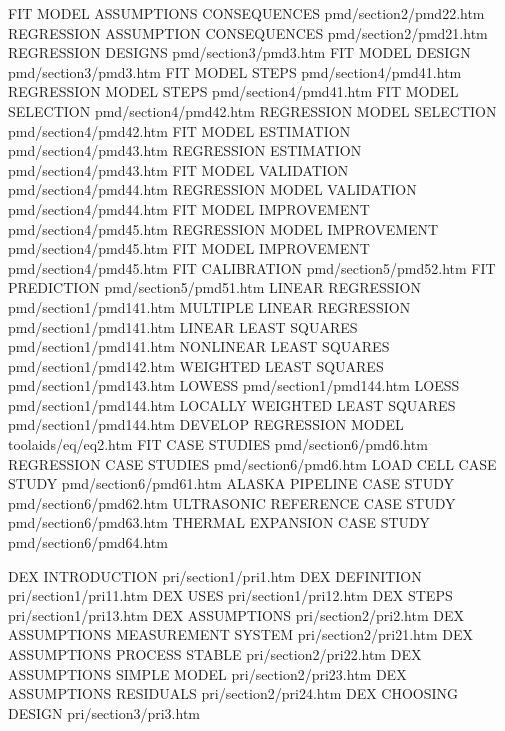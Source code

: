 FIT MODEL ASSUMPTIONS CONSEQUENCES      pmd/section2/pmd22.htm
REGRESSION ASSUMPTION CONSEQUENCES      pmd/section2/pmd21.htm
REGRESSION DESIGNS                      pmd/section3/pmd3.htm
FIT MODEL DESIGN                        pmd/section3/pmd3.htm
FIT MODEL STEPS                         pmd/section4/pmd41.htm
REGRESSION MODEL STEPS                  pmd/section4/pmd41.htm
FIT MODEL SELECTION                     pmd/section4/pmd42.htm
REGRESSION MODEL SELECTION              pmd/section4/pmd42.htm
FIT MODEL ESTIMATION                    pmd/section4/pmd43.htm
REGRESSION ESTIMATION                   pmd/section4/pmd43.htm
FIT MODEL VALIDATION                    pmd/section4/pmd44.htm
REGRESSION MODEL VALIDATION             pmd/section4/pmd44.htm
FIT MODEL IMPROVEMENT                   pmd/section4/pmd45.htm
REGRESSION MODEL IMPROVEMENT            pmd/section4/pmd45.htm
FIT MODEL IMPROVEMENT                   pmd/section4/pmd45.htm
FIT CALIBRATION                         pmd/section5/pmd52.htm
FIT PREDICTION                          pmd/section5/pmd51.htm
LINEAR REGRESSION                       pmd/section1/pmd141.htm
MULTIPLE LINEAR REGRESSION              pmd/section1/pmd141.htm
LINEAR LEAST SQUARES                    pmd/section1/pmd141.htm
NONLINEAR LEAST SQUARES                 pmd/section1/pmd142.htm
WEIGHTED LEAST SQUARES                  pmd/section1/pmd143.htm
LOWESS                                  pmd/section1/pmd144.htm
LOESS                                   pmd/section1/pmd144.htm
LOCALLY WEIGHTED LEAST SQUARES          pmd/section1/pmd144.htm
DEVELOP REGRESSION MODEL                toolaids/eq/eq2.htm
FIT CASE STUDIES                        pmd/section6/pmd6.htm
REGRESSION CASE STUDIES                 pmd/section6/pmd6.htm
LOAD CELL CASE STUDY                    pmd/section6/pmd61.htm
ALASKA PIPELINE CASE STUDY              pmd/section6/pmd62.htm
ULTRASONIC REFERENCE CASE STUDY         pmd/section6/pmd63.htm
THERMAL EXPANSION CASE STUDY            pmd/section6/pmd64.htm

DEX INTRODUCTION                        pri/section1/pri1.htm
DEX DEFINITION                          pri/section1/pri11.htm
DEX USES                                pri/section1/pri12.htm
DEX STEPS                               pri/section1/pri13.htm
DEX ASSUMPTIONS                         pri/section2/pri2.htm
DEX ASSUMPTIONS MEASUREMENT SYSTEM      pri/section2/pri21.htm
DEX ASSUMPTIONS PROCESS STABLE          pri/section2/pri22.htm
DEX ASSUMPTIONS SIMPLE MODEL            pri/section2/pri23.htm
DEX ASSUMPTIONS RESIDUALS               pri/section2/pri24.htm
DEX CHOOSING DESIGN                     pri/section3/pri3.htm

